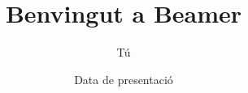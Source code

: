 \documentclass{beamer}
\title{Benvingut a Beamer}
\author{Tú}
\institute{La  teva institució}
\date{Data de presentació}
\begin{document}
\begin{frame}
\titlepage %
\end{frame}
\end{document}
